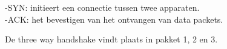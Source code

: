 -SYN: initieert een connectie tussen twee apparaten.\\
-ACK: het bevestigen van het ontvangen van data packets.

De three way handshake vindt plaats in pakket 1, 2 en 3.